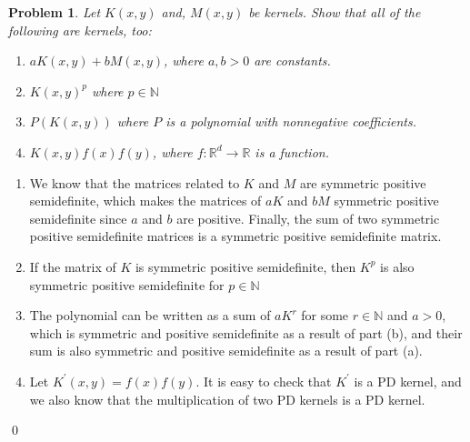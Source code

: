 \documentclass[12pt]{article}
\newtheorem{ex}{Problem}
\begin{document}
\begin{bx}
	
	\begin{ex}
	Let $K(x,y)$ and, $M(x,y)$ be kernels. Show that all of the following are kernels, too:
		\begin{enumerate}[label=(\alph*)]
		\item $aK(x,y)+bM(x,y)$, where $a,b>0$ are constants.
		\item $K(x,y)^p$ where $p \in \mathbb{N}$
		\item $P(K(x,y))$ where $P$ is a polynomial with nonnegative coefficients.
		\item $K(x,y)f(x)f(y)$, where $f:\mathbb{R}^d \rightarrow \mathbb{R}$ is a function.
		\end{enumerate}
	\end{ex}
	\tcblower
	\begin{enumerate}[label=(\alph*)]
	\item We know that the matrices related to $K$ and $M$ are symmetric positive semidefinite, which makes the matrices of $aK$ and $bM$ symmetric positive semidefinite since $a$ and $b$ are positive.
	Finally, the sum of two symmetric positive semidefinite matrices is a symmetric positive semidefinite matrix.
	\item If the matrix of $K$ is symmetric positive semidefinite, then $K^p$ is also symmetric positive semidefinite for $p\in \mathbb{N}$
	\item The polynomial can be written as a sum of $aK^r$ for some $r\in \mathbb{N}$ and $a>0$, which is symmetric and positive semidefinite as a result of part (b), and their sum is also symmetric and positive semidefinite as a result of part (a).
	\item  Let $K^\prime(x,y)=f(x)f(y)$. It is easy to check that $K^\prime$ is a PD kernel, and we also know that the multiplication of two PD kernels is a PD kernel.
	\end{enumerate}
	\qed
\end{bx}
\end{document}
